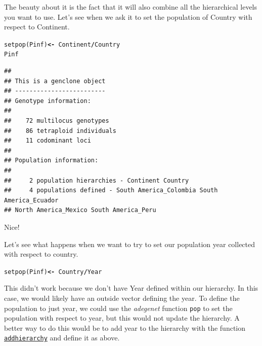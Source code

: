 \documentclass[letterpaper]{article}\usepackage[]{graphicx}\usepackage[]{color}
\makeatletter
\newcommand{\hlopt}[1]{\textcolor[rgb]{1,0,0.502}{\textbf{#1}}}%
\newcommand{\hlstd}[1]{\textcolor[rgb]{0,0,0}{#1}}%
\newcommand{\hlkwb}[1]{\textcolor[rgb]{0.502,0.502,0.753}{\textbf{#1}}}%
\newcommand{\hlkwd}[1]{\textcolor[rgb]{0,0.267,0.4}{#1}}%
\newenvironment{kframe}{%
 \def\at@end@of@kframe{}%
 \ifinner\ifhmode%
  \def\at@end@of@kframe{\end{minipage}}%
  \begin{minipage}{\columnwidth}%
 \fi\fi%
 \def\FrameCommand##1{\hskip\@totalleftmargin \hskip-\fboxsep
 \colorbox{shadecolor}{##1}\hskip-\fboxsep
     \hskip-\linewidth \hskip-\@totalleftmargin \hskip\columnwidth}%
 \MakeFramed {\advance\hsize-\width
   \@totalleftmargin\z@ \linewidth\hsize
   \@setminipage}}%
 {\par\unskip\endMakeFramed%
 \at@end@of@kframe}
\newenvironment{knitrout}{}{} %
\newcommand{\cmdlink}[2]{
  \texttt{\hyperref[#1]{#2}}
}
\newcommand{\adegenet}{\textit{adegenet}}
\makeatother
\begin{document}
\noindent
The beauty about it is the fact that it will also combine all the hierarchical
levels you want to use. Let's see when we ask it to set the population of
Country with respect to Continent.

\begin{knitrout}\footnotesize
{}\color{fgcolor}\begin{kframe}
\begin{alltt}
\hlkwd{setpop}\hlstd{(Pinf)} \hlkwb{<-} \hlopt{~}\hlstd{Continent}\hlopt{/}\hlstd{Country}
\hlstd{Pinf}
\end{alltt}
\begin{verbatim}
## 
## This is a genclone object
## -------------------------
## Genotype information:
## 
##    72 multilocus genotypes
##    86 tetraploid individuals
##    11 codominant loci
## 
## Population information:
## 
##     2 population hierarchies - Continent Country
##     4 populations defined - South America_Colombia South America_Ecuador 
## North America_Mexico South America_Peru
\end{verbatim}
\end{kframe}
\end{knitrout}

\noindent
Nice!

Let's see what happens when we want to try to set our population year collected
with respect to country.

\begin{knitrout}\footnotesize
{}\color{fgcolor}\begin{kframe}
\begin{alltt}
\hlkwd{setpop}\hlstd{(Pinf)} \hlkwb{<-} \hlopt{~}\hlstd{Country}\hlopt{/}\hlstd{Year}
\end{alltt}


{\ttfamily\noindent\bfseries\color{errorcolor}{\#\# Error: One or more levels in the given hierarchy is not present in the data frame. \\\#\# Hierarchy:	 Country, Year \\\#\# Data:		 Continent, Country}}\end{kframe}
\end{knitrout}

\noindent
This didn't work because we don't have Year defined within our hierarchy. In this
case, we would likely have an outside vector defining the year. To define the 
population to just year, we could use the \adegenet{} function \texttt{pop}
to set the population with respect to year, but this would not update the
hierarchy. A better way to do this would be to add year to the hierarchy with the
function \cmdlink{data.manip:hier:manip}{addhierarchy} and define it as above.
\end{document}
